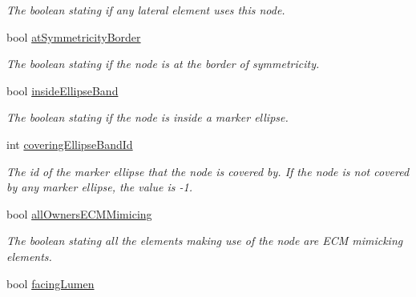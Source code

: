\begin{DoxyCompactItemize}
\begin{DoxyCompactList}\small\item\em The boolean stating if any lateral element uses this node. \end{DoxyCompactList}\item 
\hypertarget{classNode_ae14618d71e657039ed84316154be7330}{}bool \hyperlink{classNode_ae14618d71e657039ed84316154be7330}{at\+Symmetricity\+Border}\label{classNode_ae14618d71e657039ed84316154be7330}

\begin{DoxyCompactList}\small\item\em The boolean stating if the node is at the border of symmetricity. \end{DoxyCompactList}\item 
\hypertarget{classNode_a216c4bf4af00dc77d8c88c4d2952f6ab}{}bool \hyperlink{classNode_a216c4bf4af00dc77d8c88c4d2952f6ab}{inside\+Ellipse\+Band}\label{classNode_a216c4bf4af00dc77d8c88c4d2952f6ab}

\begin{DoxyCompactList}\small\item\em The boolean stating if the node is inside a marker ellipse. \end{DoxyCompactList}\item 
\hypertarget{classNode_a5a0c478d6925dc16abf3995061fda191}{}int \hyperlink{classNode_a5a0c478d6925dc16abf3995061fda191}{covering\+Ellipse\+Band\+Id}\label{classNode_a5a0c478d6925dc16abf3995061fda191}

\begin{DoxyCompactList}\small\item\em The id of the marker ellipse that the node is covered by. If the node is not covered by any marker ellipse, the value is -\/1. \end{DoxyCompactList}\item 
\hypertarget{classNode_aa9eb82543b868adc05b5543251ebb42f}{}bool \hyperlink{classNode_aa9eb82543b868adc05b5543251ebb42f}{all\+Owners\+E\+C\+M\+Mimicing}\label{classNode_aa9eb82543b868adc05b5543251ebb42f}

\begin{DoxyCompactList}\small\item\em The boolean stating all the elements making use of the node are E\+C\+M mimicking elements. \end{DoxyCompactList}\item 
\hypertarget{classNode_a377cb501b279a025c1c53f24572ed415}{}bool \hyperlink{classNode_a377cb501b279a025c1c53f24572ed415}{facing\+Lumen}\label{classNode_a377cb501b279a025c1c53f24572ed415}


\end{DoxyCompactItemize}
